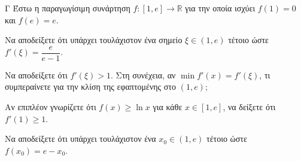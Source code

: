 \begin{thema}{Γ}
Έστω η παραγωγίσιμη συνάρτηση $f: [1, e] \to \mathbb{R}$ για την οποία ισχύει $f(1)=0$ και $f(e)=e$.
\begin{erwthma}
  \item Να αποδείξετε ότι υπάρχει τουλάχιστον ένα σημείο $\xi \in (1, e)$ τέτοιο ώστε $f'(\xi) = \dfrac{e}{e-1}$.
  \item Να αποδείξετε ότι $f'(\xi) > 1$. Στη συνέχεια, αν $\min f'(x) = f'(\xi)$, τι συμπεραίνετε για την κλίση της εφαπτομένης στο $(1, e)$;
  \item Αν επιπλέον γνωρίζετε ότι $f(x) \ge \ln x$ για κάθε $x \in [1, e]$, να δείξετε ότι $f'(1) \ge 1$.
  \item Να αποδείξετε ότι υπάρχει τουλάχιστον ένα $x_0 \in (1, e)$ τέτοιο ώστε $f(x_0) = e - x_0$. 
\end{erwthma}
\end{thema}
